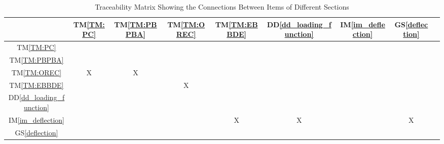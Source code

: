\documentclass[12pt]{article}
\newcommand{\ddref}[1]{DD\ref{#1}}
\newcommand{\tref}[1]{TM\ref{#1}}
\newcommand{\gsref}[1]{GS\ref{#1}}
\newcommand{\iref}[1]{IM\ref{#1}}
\begin{document}
\begin{table}[h!]
    \centering
    \begin{tabular}{|c|c|c|c|c|c|c|c|c|}
        \hline
                                    & \tref{TM:PC} & \tref{TM:PBPBA} & \tref{TM:OREC} & \tref{TM:EBBDE} & \ddref{dd_loading_function} & \iref{im_deflection} & \gsref{deflection} \\ \hline
        \tref{TM:PC}                &              &                 &                &                 &                             &                      &                    \\ \hline
        \tref{TM:PBPBA}             &              &                 &                &                 &                             &                      &                    \\ \hline
        \tref{TM:OREC}              & X            & X               &                &                 &                             &                      &                    \\ \hline
        \tref{TM:EBBDE}             &              &                 & X              &                 &                             &                      &                    \\ \hline
        \ddref{dd_loading_function} &              &                 &                &                 &                             &                      &                    \\ \hline
        \iref{im_deflection}        &              &                 &                & X               & X                           &                      & X                  \\ \hline
        \gsref{deflection}          &              &                 &                &                 &                             &                      &                    \\ \hline
    \end{tabular}
    \caption{Traceability Matrix Showing the Connections Between Items of Different Sections}
    \label{Table:trace}
\end{table}
\end{document}
